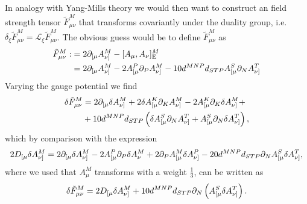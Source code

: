 In analogy with Yang-Mills theory we would then want to construct an field strength tensor $\tilde{F}^M_{\mu\nu}$ that transforms covariantly under the duality group, i.e.\ $\delta_\xi \tilde{F}^M_{\mu\nu}\overset{}=\mathscr{L}_\xi \tilde{F}^M_{\mu\nu}$. The obvious guess would be to define $\tilde{F}^{M}_{\mu\nu}$ as 
\begin{equation}
    \begin{aligned}
    \tilde{F}^M_{\mu\nu} :&= 2\partial_{[\mu}A_{\nu]}^M-[A_\mu,A_\nu]_{\text{E}}^M\\
     &= 2\partial_{[\mu}A^M_{\nu]}-2A^P_{[\mu}\partial_PA^M_{\nu]}-10d^{MNP}d_{STP}A^S_{[\mu}\partial_NA^T_{\nu]}
    \end{aligned}
\end{equation}
Varying the gauge potential we find 
\begin{equation}
    \begin{aligned}
    \delta \tilde{F}^M_{\mu\nu} &= 2\partial_{[\mu}\delta A^M_{\nu]}+2\delta A^K_{[\mu}\partial_KA^M_{\nu]}-2A^K_{[\mu}\partial_K\delta A^M_{\nu]}+\\
    &+10d^{MNP}d_{STP}\left(\delta A^S_{[\mu}\partial_NA^T_{\nu]}+ A^S_{[\mu}\partial_N\delta A^T_{\nu]}\right),
    \end{aligned}
\end{equation}
which by comparison with the expression 
\begin{equation}
    \begin{aligned}
    2D_{[\mu}\delta A^M_{\nu]} = 2\partial_{[\mu}\delta A^M_{\nu]}-2A^P_{[\mu}\partial_P\delta A^M_{\nu}+2\partial_PA^M_{[\mu}\delta A^P_{\nu]}-20d^{MNP}d_{STP}\partial_NA^S_{[\mu}\delta A^T_{\nu]},
    \end{aligned}
\end{equation}
where we used that $A^M_\mu$ transforms with a weight $\frac{1}{3}$, can be written as 
\begin{equation}
    \delta \tilde{F}^M_{\mu\nu} = 2D_{[\mu}\delta A^M_{\nu]}+10d^{MNP}d_{STP}\partial_N\left(A^S_{[\mu}\delta A^T_{\nu]}\right).
\end{equation}

